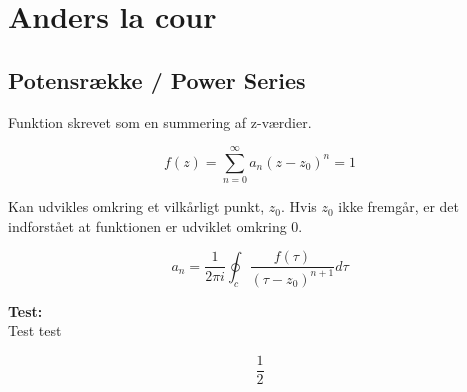 \chapter{Anders la cour}

\section{Potensrække / Power Series}

Funktion skrevet som en summering af z-værdier. 


\begin{equation*}
       f(z)=\sum_{n=0}^{\infty} a_{n}(z-z_0)^{n} = 1  
\end{equation*}

Kan udvikles omkring et vilkårligt punkt, \(z_0\).
Hvis \(z_0\) ikke fremgår, er det indforstået at funktionen er udviklet omkring 0. 


\begin{equation*}
a_n = \frac{1}{2\pi i} \oint_c \frac{f(\tau)}{(\tau-z_0)^{n+1}} d\tau
\end{equation*}


\begin{tcolorbox}[colback=white!5!white,colframe=blue!75!black]
  \textbf{Test:}\\
Test test
\end{tcolorbox}




$$ \frac{1}{2} $$